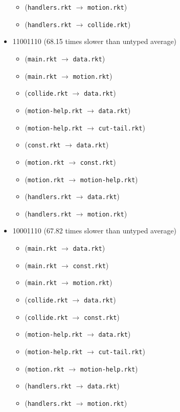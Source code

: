 \documentclass{article}
\newcommand{\mono}[1]{\texttt{#1}}
\begin{document}
\begin{itemize}
\begin{itemize}
  \item (\mono{handlers.rkt} $\rightarrow$ \mono{motion.rkt})
  \item (\mono{handlers.rkt} $\rightarrow$ \mono{collide.rkt})
  \end{itemize}
\item 11001110 (68.15 times slower than untyped average)
  \begin{itemize}
  \item (\mono{main.rkt} $\rightarrow$ \mono{data.rkt})
  \item (\mono{main.rkt} $\rightarrow$ \mono{motion.rkt})
  \item (\mono{collide.rkt} $\rightarrow$ \mono{data.rkt})
  \item (\mono{motion-help.rkt} $\rightarrow$ \mono{data.rkt})
  \item (\mono{motion-help.rkt} $\rightarrow$ \mono{cut-tail.rkt})
  \item (\mono{const.rkt} $\rightarrow$ \mono{data.rkt})
  \item (\mono{motion.rkt} $\rightarrow$ \mono{const.rkt})
  \item (\mono{motion.rkt} $\rightarrow$ \mono{motion-help.rkt})
  \item (\mono{handlers.rkt} $\rightarrow$ \mono{data.rkt})
  \item (\mono{handlers.rkt} $\rightarrow$ \mono{motion.rkt})
  \end{itemize}
\item 10001110 (67.82 times slower than untyped average)
  \begin{itemize}
  \item (\mono{main.rkt} $\rightarrow$ \mono{data.rkt})
  \item (\mono{main.rkt} $\rightarrow$ \mono{const.rkt})
  \item (\mono{main.rkt} $\rightarrow$ \mono{motion.rkt})
  \item (\mono{collide.rkt} $\rightarrow$ \mono{data.rkt})
  \item (\mono{collide.rkt} $\rightarrow$ \mono{const.rkt})
  \item (\mono{motion-help.rkt} $\rightarrow$ \mono{data.rkt})
  \item (\mono{motion-help.rkt} $\rightarrow$ \mono{cut-tail.rkt})
  \item (\mono{motion.rkt} $\rightarrow$ \mono{motion-help.rkt})
  \item (\mono{handlers.rkt} $\rightarrow$ \mono{data.rkt})
  \item (\mono{handlers.rkt} $\rightarrow$ \mono{motion.rkt})
  \end{itemize}


\end{itemize}
\end{document}
